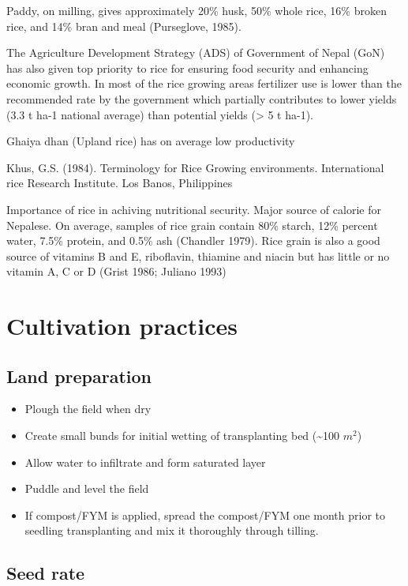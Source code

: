 \documentclass[12pt,]{article}
\providecommand{\tightlist}{%
  \setlength{\itemsep}{0pt}\setlength{\parskip}{0pt}}
\begin{document}
Paddy, on milling, gives approximately 20\% husk, 50\% whole rice, 16\% broken rice, and 14\% bran and meal (Purseglove, 1985).

The Agriculture Development Strategy (ADS) of Government of Nepal (GoN) has also given top priority to rice for ensuring food security and enhancing economic growth. In most of the rice growing areas fertilizer use is lower than the recommended rate by the government which partially contributes to lower yields (3.3 t ha-1 national average) than potential yields (\textgreater{} 5 t ha-1).

Ghaiya dhan (Upland rice) has on average low productivity

Khus, G.S. (1984). Terminology for Rice Growing environments. International rice Research Institute. Los Banos, Philippines

Importance of rice in achiving nutritional security. Major source of calorie for Nepalese. On average, samples of rice grain contain 80\% starch, 12\% percent water, 7.5\% protein, and 0.5\% ash (Chandler 1979). Rice grain is also a good source of vitamins B and E, riboflavin, thiamine and niacin but has little or no vitamin A, C or D (Grist 1986; Juliano 1993)

\hypertarget{cultivation-practices}{%
\section{Cultivation practices}\label{cultivation-practices}}

\hypertarget{land-preparation}{%
\subsection{Land preparation}\label{land-preparation}}

\begin{itemize}
\tightlist
\item
  Plough the field when dry
\item
  Create small bunds for initial wetting of transplanting bed (\textasciitilde{}100 \(m^2\))
\item
  Allow water to infiltrate and form saturated layer
\item
  Puddle and level the field
\item
  If compost/FYM is applied, spread the compost/FYM one month prior to seedling transplanting and mix it thoroughly through tilling.
\end{itemize}

\hypertarget{seed-rate}{%
\subsection{Seed rate}\label{seed-rate}}
\end{document}

